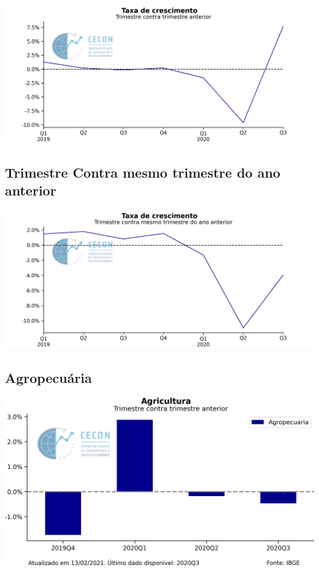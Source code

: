 \documentclass{SelfArx}
\begin{document}
\begin{center}
\includegraphics[width=.9\linewidth]{./figs/PIB/PIB.png}
\end{center}

\subsection*{Trimestre Contra mesmo trimestre do ano anterior}
\label{sec:org404e110}

\begin{center}
\includegraphics[width=.9\linewidth]{./figs/PIB/PIB_YoY.png}
\end{center}

\subsection*{Agropecuária}
\label{sec:orgb4486bb}

\begin{center}
\includegraphics[width=.9\linewidth]{./figs/PIB/Agropecuaria.png}
\end{center}
\end{document}
